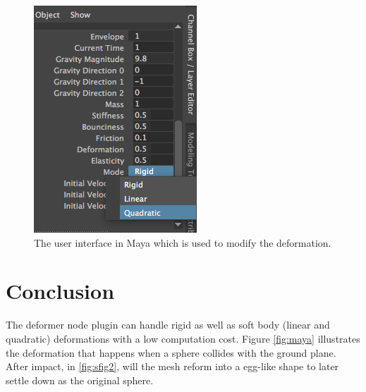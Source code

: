  \begin{figure}[t]
    \includegraphics[width=\linewidth]{img/gui.png}
    \caption{The user interface in Maya which is used to modify the deformation.}
    \label{fig:gui}
    \end{figure}

\section{Conclusion}

The deformer node plugin can handle rigid as well as soft body (linear and quadratic) deformations with a low computation cost. Figure \ref{fig:maya} illustrates the deformation that happens when a sphere collides with the ground plane. After impact, in \ref{fig:sfig2}, will the mesh reform into a egg-like shape to later settle down as the original sphere.

